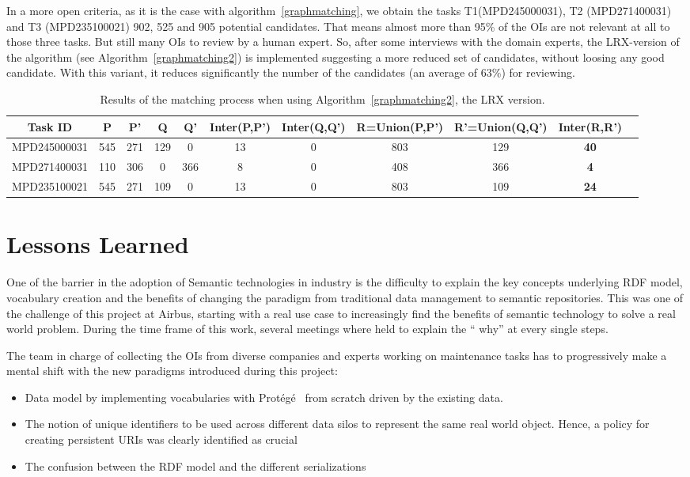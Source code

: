 \documentclass[runningheads,a4paper]{{llncs}}
\newcommand{\xmark}{\ding{55}}
\newcommand{\xitem}{\item[\xmark]}
\begin{document}
In a more open criteria, as it is the case with algorithm~\ref{graphmatching}, we obtain the tasks T1(MPD245000031), T2 (MPD271400031) and T3 (MPD235100021) 902, 525 and 905 potential candidates. That means almost more than 95\% of the OIs are not relevant at all to those three tasks. But still many OIs to review by a human expert. So, after some interviews with the domain experts, the LRX-version of the algorithm (see Algorithm~\ref{graphmatching2}) is implemented suggesting a more reduced set of candidates, without loosing any good candidate. With this variant, it reduces significantly the number of the candidates (an average of 63\%) for reviewing.    

\begin{table}[!htp]
\scriptsize
\centering

\begin{tabular}{|c|c|c|c|c|c|c|c|c|c|c|} 
\hline 
Task ID & P & P' & Q & Q' & Inter(P,P') & Inter(Q,Q') & R=Union(P,P') & R'=Union(Q,Q') & Inter(R,R') \\ 
\hline 
MPD245000031 & 545 & 271 & 129 & 0 & 13 & 0 & 803 & 129 & \textbf{40}\\ 
\hline 
MPD271400031 & 110 & 306 & 0 & 366 & 8 & 0 & 408 & 366 & \textbf{4} \\ 
\hline 
MPD235100021 & 545 & 271 & 109 & 0 & 13 & 0 & 803 & 109 & \textbf{24} \\  
\hline 
\end{tabular} 
\caption{Results of the matching process when using Algorithm~\ref{graphmatching2}, the LRX version.}
\label{tab:algo2}
\end{table}


\section{Lessons Learned}
\label{sec:lessons}
One of the barrier in the adoption of Semantic technologies in industry is the difficulty to explain the key concepts underlying RDF model, vocabulary creation and the benefits of changing the paradigm from traditional data management to semantic repositories. This was one of the challenge of this project at Airbus, starting with a real use case to increasingly find the benefits of semantic technology to solve a real world problem. During the time frame of this work, several meetings where held to explain the `` why'' at every single steps. 

The team in charge of collecting the OIs from diverse companies and experts working on maintenance tasks has to progressively make a mental shift with the new paradigms introduced during this project:
\begin{itemize}
\xitem Data model by implementing vocabularies with Prot\'eg\'e~\cite{noy2001} from scratch driven by the existing data.
\xitem The notion of unique identifiers to be used across different data silos to represent the same real world object. Hence, a policy for creating persistent URIs was clearly identified as crucial
\xitem The confusion between the RDF model and the different serializations 
\end{itemize}  
\end{document}
